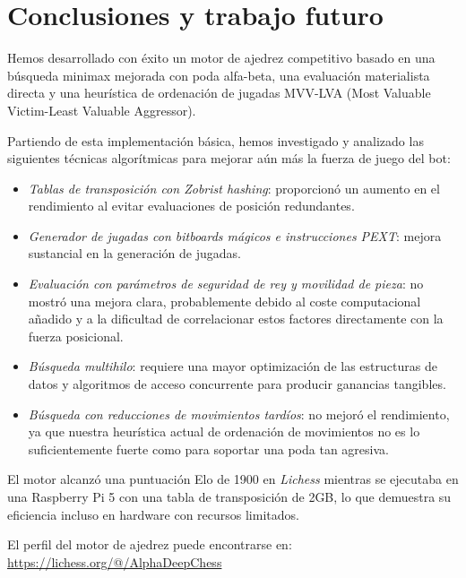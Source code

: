 \chapter{Conclusiones y trabajo futuro}

Hemos desarrollado con éxito un motor de ajedrez competitivo basado en una búsqueda minimax mejorada con poda alfa-beta, una evaluación materialista directa y una heurística de ordenación de jugadas MVV-LVA (Most Valuable Victim-Least Valuable Aggressor).

\vspace{1em}

\noindent Partiendo de esta implementación básica, hemos investigado y analizado las siguientes técnicas algorítmicas para mejorar aún más la fuerza de juego del bot:

\begin{itemize}[itemsep=1pt]
    \item \textit{Tablas de transposición con Zobrist hashing}: proporcionó un aumento en el rendimiento al evitar evaluaciones de posición redundantes.
    \item \textit{Generador de jugadas con bitboards mágicos e instrucciones PEXT}: mejora sustancial en la generación de jugadas.
    \item \textit{Evaluación con parámetros de seguridad de rey y movilidad de pieza}: no mostró una mejora clara, probablemente debido al coste computacional añadido y a la dificultad de correlacionar estos factores directamente con la fuerza posicional.
    \item \textit{Búsqueda multihilo}: requiere una mayor optimización de las estructuras de datos y algoritmos de acceso concurrente para producir ganancias tangibles.
    \item \textit{Búsqueda con reducciones de movimientos tardíos}: no mejoró el rendimiento, ya que nuestra heurística actual de ordenación de movimientos no es lo suficientemente fuerte como para soportar una poda tan agresiva.
\end{itemize}

\noindent El motor alcanzó una puntuación Elo de 1900 en \textit{Lichess} mientras se ejecutaba en una Raspberry Pi 5 con una tabla de transposición de 2GB, lo que demuestra su eficiencia incluso en hardware con recursos limitados.

\vspace{1em}

\noindent El perfil del motor de ajedrez puede encontrarse en: \\
\url{https://lichess.org/@/AlphaDeepChess}

